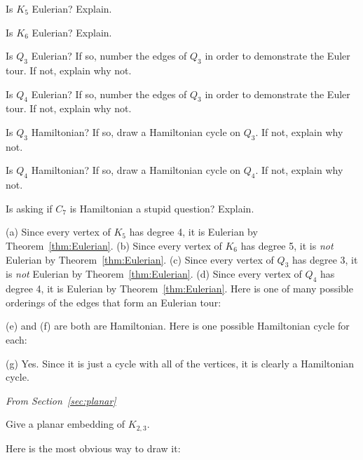 \begin{requ}
\begin{lenum}
\item Is $K_5$ Eulerian? Explain.
\item Is $K_6$ Eulerian? Explain.
\item Is $Q_3$ Eulerian? If so, number the edges of $Q_3$ in order to demonstrate the Euler tour. If not, explain why not.
\item Is $Q_4$ Eulerian? If so, number the edges of $Q_3$ in order to demonstrate the Euler tour. If not, explain why not.
\item Is $Q_3$ Hamiltonian? If so, draw a Hamiltonian cycle on $Q_3$. If not, explain why not.
\item Is $Q_4$ Hamiltonian? If so, draw a Hamiltonian cycle on $Q_4$. If not, explain why not.
\item Is asking if $C_7$ is Hamiltonian a stupid question? Explain.
\end{lenum}
\begin{requanswer}
(a) Since every vertex of $K_5$ has degree 4, it is Eulerian by Theorem~\ref{thm:Eulerian}.
(b) Since every vertex of $K_6$ has degree 5, it is {\em not} Eulerian by Theorem~\ref{thm:Eulerian}.
(c) Since every vertex of $Q_3$ has degree 3, it is {\em not} Eulerian by Theorem~\ref{thm:Eulerian}.
(d) Since every vertex of $Q_4$ has degree 4, it is Eulerian by Theorem~\ref{thm:Eulerian}.
Here is one of many possible orderings of the edges that form an Eulerian tour:


\noindent
(e) and (f) are both are Hamiltonian. Here is one possible Hamiltonian cycle for each:


\noindent
(g) Yes. Since it is just a cycle with all of the vertices, it is clearly a Hamiltonian cycle. 
\end{requanswer}
\end{requ}

\noindent
{\em From Section~\ref{sec:planar}}

\begin{requ}
Give a planar embedding of $K_{2,3}$. 
\begin{requanswer}
Here is the most obvious way to draw it: 

\end{requanswer}
\end{requ}

